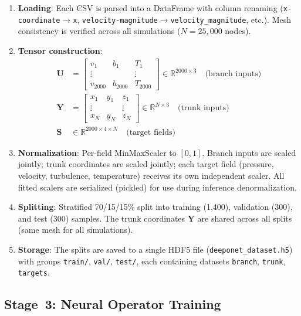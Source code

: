 \documentclass[conference]{IEEEtran}
\begin{document}
\begin{enumerate}
    \item \textbf{Loading}: Each CSV is parsed into a DataFrame with column renaming (\texttt{x-coordinate}$\to$\texttt{x}, \texttt{velocity-magnitude}$\to$\texttt{velocity\_magnitude}, etc.). Mesh consistency is verified across all simulations ($N = 25{,}000$ nodes).
    
    \item \textbf{Tensor construction}:
    \begin{align}
    \bm{U} &= \begin{bmatrix} v_1 & b_1 & T_1 \\ \vdots & & \vdots \\ v_{2000} & b_{2000} & T_{2000} \end{bmatrix} \in \mathbb{R}^{2000 \times 3} \quad\text{(branch inputs)} \\
    \bm{Y} &= \begin{bmatrix} x_1 & y_1 & z_1 \\ \vdots & & \vdots \\ x_N & y_N & z_N \end{bmatrix} \in \mathbb{R}^{N \times 3} \quad\text{(trunk inputs)} \\
    \bm{S} &\in \mathbb{R}^{2000 \times 4 \times N} \quad\text{(target fields)}
    \end{align}
    
    \item \textbf{Normalization}: Per-field MinMaxScaler to $[0,1]$. Branch inputs are scaled jointly; trunk coordinates are scaled jointly; each target field (pressure, velocity, turbulence, temperature) receives its own independent scaler. All fitted scalers are serialized (pickled) for use during inference denormalization.
    
    \item \textbf{Splitting}: Stratified 70/15/15\% split into training (1,400), validation (300), and test (300) samples. The trunk coordinates $\bm{Y}$ are shared across all splits (same mesh for all simulations).
    
    \item \textbf{Storage}: The splits are saved to a single HDF5 file (\texttt{deeponet\_dataset.h5}) with groups \texttt{train/}, \texttt{val/}, \texttt{test/}, each containing datasets \texttt{branch}, \texttt{trunk}, \texttt{targets}.
\end{enumerate}

\subsection{Stage~3: Neural Operator Training}
\end{document}
